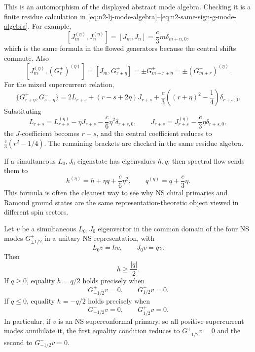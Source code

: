 This is an automorphism of the displayed abstract mode algebra.  Checking it
is a finite residue calculation in
\eqref{eq:n2-lj-mode-algebra}--\eqref{eq:n2-same-sign-g-mode-algebra}.  For
example,
\[
  [J_m^{(\eta)},J_n^{(\eta)}]
  =
  [J_m,J_n]
  =
  \frac c3m\delta_{m+n,0},
\]
which is the same formula in the flowed generators because the central shifts
commute.  Also
\[
  [J_m^{(\eta)},(G^\pm_r)^{(\eta)}]
  =
  [J_m,G^\pm_{r\pm\eta}]
  =
  \pm G^\pm_{m+r\pm\eta}
  =
  \pm(G^\pm_{m+r})^{(\eta)}.
\]
For the mixed supercurrent relation,
\[
  \{G^+_{r+\eta},G^-_{s-\eta}\}
  =
  2L_{r+s}
  +(r-s+2\eta)J_{r+s}
  +\frac c3\left((r+\eta)^2-\frac14\right)\delta_{r+s,0}.
\]
Substituting
\[
  L_{r+s}=L^{(\eta)}_{r+s}
  -\eta J_{r+s}
  -\frac c6\eta^2\delta_{r+s,0},
  \qquad
  J_{r+s}=J^{(\eta)}_{r+s}
  -\frac c3\eta\delta_{r+s,0},
\]
the \(J\)-coefficient becomes \(r-s\), and the central coefficient reduces
to \(\frac c3(r^2-1/4)\).  The remaining brackets are checked in the same
residue algebra.

If a simultaneous \(L_0,J_0\) eigenstate has eigenvalues \(h,q\), then
spectral flow sends them to
\begin{equation}
  h^{(\eta)}
  =
  h+\eta q+\frac c6\eta^2,
  \qquad
  q^{(\eta)}
  =
  q+\frac c3\eta .
  \label{eq:n2-spectral-flow-hq}
\end{equation}
This formula is often the cleanest way to see why NS chiral primaries and
Ramond ground states are the same representation-theoretic object viewed in
different spin sectors.

\begin{proposition}
\label{prop:n2-chiral-primary-bound}
Let \(v\) be a simultaneous \(L_0,J_0\) eigenvector in the common domain of
the four NS modes \(G^\pm_{\pm1/2}\) in a unitary NS representation, with
\[
  L_0v=hv,\qquad J_0v=qv.
\]
Then
\begin{equation}
  h\ge\frac{|q|}{2}.
  \label{eq:n2-ns-unitarity-bound}
\end{equation}
If \(q\ge0\), equality \(h=q/2\) holds precisely when
\begin{equation}
  G^+_{-1/2}v=0,
  \qquad
  G^-_{1/2}v=0.
  \label{eq:n2-chiral-primary-condition}
\end{equation}
If \(q\le0\), equality \(h=-q/2\) holds precisely when
\begin{equation}
  G^-_{-1/2}v=0,
  \qquad
  G^+_{1/2}v=0.
  \label{eq:n2-antichiral-primary-condition}
\end{equation}
In particular, if \(v\) is an NS superconformal primary, so all positive
supercurrent modes annihilate it, the first equality condition reduces to
\(G^+_{-1/2}v=0\) and the second to \(G^-_{-1/2}v=0\).
\end{proposition}

